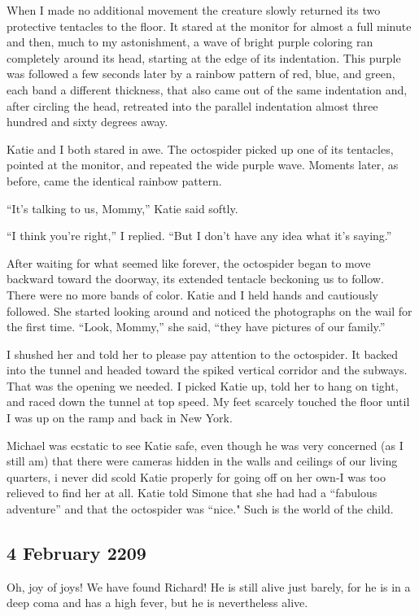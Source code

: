 \documentclass[]{article}
\begin{document}
{When I made no additional movement the creature slowly returned its two protective tentacles to the floor.  It stared at the monitor for almost a full minute and then, much to my astonishment, a wave of bright purple coloring ran completely around its head, starting at the edge of its indentation.  This purple was followed a few seconds later by a rainbow pattern of red, blue, and green, each band a different thickness, that also came out of the same indentation and, after circling the head, retreated into the parallel indentation almost three hundred and sixty degrees away.

Katie and I both stared in awe.  The octospider picked up one of its tentacles, pointed at the monitor, and repeated the wide purple wave.  Moments later, as before, came the identical rainbow pattern.

“It’s talking to us, Mommy,” Katie said softly.

“I think you’re right,” I replied.  “But I don’t have any idea what it’s saying.”

After waiting for what seemed like forever, the octospider began to move backward toward the doorway, its extended tentacle beckoning us to follow.  There were no more bands of color.  Katie and I held hands and cautiously followed.  She started looking around and noticed the photographs on the wail for the first time.  “Look, Mommy,” she said, “they have pictures of our family.”

I shushed her and told her to please pay attention to the octospider.  It backed into the tunnel and headed toward the spiked vertical corridor and the subways.  That was the opening we needed.  I picked Katie up, told her to hang on tight, and raced down the tunnel at top speed.  My feet scarcely touched the floor until I was up on the ramp and back in New York.

Michael was ecstatic to see Katie safe, even though he was very concerned (as I still am) that there were cameras hidden in the walls and ceilings of our living quarters, i never did scold Katie properly for going off on her own-I was too relieved to find her at all.  Katie told Simone that she had had a “fabulous adventure” and that the octospider was “nice."  Such is the world of the child.

\subsection*{4 February 2209}

Oh, joy of joys! We have found Richard! He is still alive just barely, for he is in a deep coma and has a high fever, but he is nevertheless alive.

}
\end{document}
